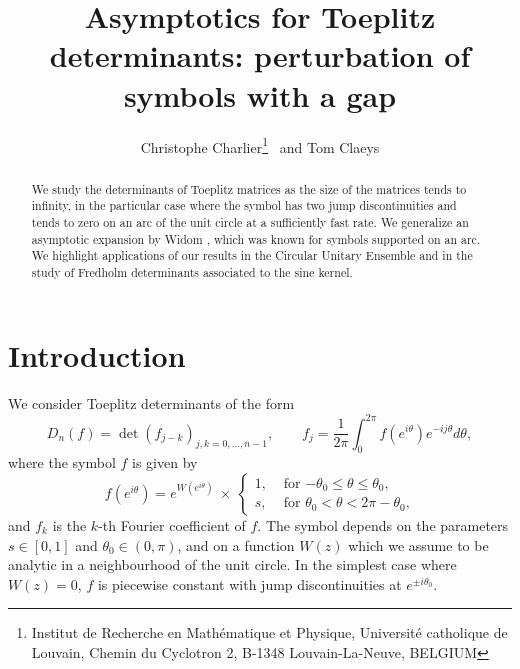 \documentclass[11pt,fleqn]{article}
\numberwithin{equation}{section}
\begin{document}
\title{Asymptotics for Toeplitz determinants: perturbation of symbols with a gap}
\author{Christophe Charlier\footnote{Institut de Recherche en Math\'ematique et Physique,  Universit\'e
catholique de Louvain, Chemin du Cyclotron 2, B-1348
Louvain-La-Neuve, BELGIUM}
 \ and Tom Claeys\footnotemark[\value{footnote}] }

\maketitle

\begin{abstract}
We study the determinants of Toeplitz matrices as the size of the matrices tends to infinity, in the particular case where the symbol has two jump discontinuities and tends to zero on an arc of the unit circle at a sufficiently fast rate. 
We generalize an asymptotic expansion by Widom \cite{Widom}, which was known for symbols supported on an arc.
We highlight applications of our results in the Circular Unitary Ensemble and in the study of Fredholm determinants associated to the sine kernel. 
\end{abstract}


\section{Introduction}

We consider Toeplitz determinants of the form
\begin{equation}\label{Toeplitz}
D_n(f) = \det(f_{j-k})_{j,k=0,\ldots, n-1},\qquad f_{j} = \frac{1}{2\pi} \int_{0}^{2\pi} f(e^{i\theta}) e^{-ij\theta} d\theta,
\end{equation}
where the symbol $f$ is given by
\begin{equation}\label{symbol}
f(e^{i\theta}) = e^{W(e^{i\theta})}\ \times\ 
\begin{cases}
1,&\mbox{ for $-\theta_0\leq \theta\leq \theta_0$,}\\
s,&\mbox{ for $\theta_0<\theta<2\pi-\theta_0$,}
\end{cases}
\end{equation}
and $f_{k}$ is the $k$-th Fourier coefficient of $f$. The symbol depends on the parameters $s\in [0,1]$ and $\theta_0 \in (0,\pi)$, and on a function $W(z)$ which we assume to be analytic in a neighbourhood of the unit circle. In the simplest case where $W(z)=0$, $f$ is piecewise constant with jump discontinuities at $e^{\pm i\theta_0}$.  
\end{document}
